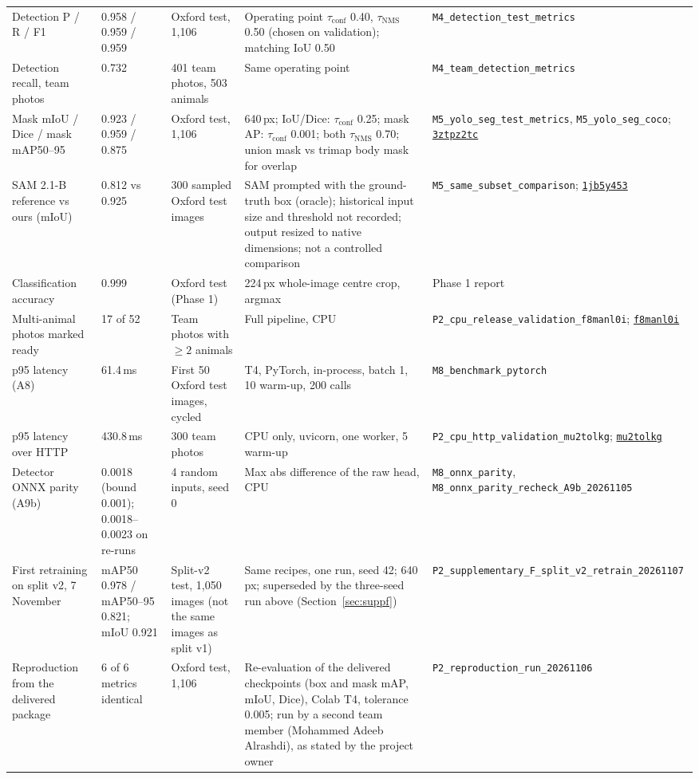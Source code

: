 \documentclass[11pt,a4paper]{article}
\newcommand{\tconf}{$\tau_{\text{conf}}$}
\newcommand{\tnms}{$\tau_{\text{NMS}}$}
\newcommand{\run}[1]{\href{https://wandb.ai/yasser-alhajlah-kaust/smart-pet-vision/runs/#1}{\texttt{#1}}}
\newcommand{\ev}[1]{\nolinkurl{#1}}
\begin{document}
{\begin{xltabular}{\linewidth}{@{}P{2.7cm} P{1.9cm} P{2.7cm} Y P{3.3cm}@{}}
Detection P / R / F1 & 0.958 / 0.959 / 0.959 & Oxford test, 1,106 & Operating point \tconf{} 0.40, \tnms{} 0.50 (chosen on validation); matching IoU 0.50 & \ev{M4_detection_test_metrics} \\
Detection recall, team photos & 0.732 & 401 team photos, 503 animals & Same operating point & \ev{M4_team_detection_metrics} \\
Mask mIoU / Dice / mask mAP50--95 & 0.923 / 0.959 / 0.875 & Oxford test, 1,106 & 640\,px; IoU/Dice: \tconf{} 0.25; mask AP: \tconf{} 0.001; both \tnms{} 0.70; union mask vs trimap body mask for overlap & \ev{M5_yolo_seg_test_metrics}, \ev{M5_yolo_seg_coco}; \run{3ztpz2tc} \\
SAM 2.1-B reference vs ours (mIoU) & 0.812 vs 0.925 & 300 sampled Oxford test images & SAM prompted with the ground-truth box (oracle); historical input size and threshold not recorded; output resized to native dimensions; not a controlled comparison & \ev{M5_same_subset_comparison}; \run{1jb5y453} \\
Classification accuracy & 0.999 & Oxford test (Phase 1) & 224\,px whole-image centre crop, argmax & Phase 1 report \\
Multi-animal photos marked ready & 17 of 52 & Team photos with $\geq2$ animals & Full pipeline, CPU & \ev{P2_cpu_release_validation_f8manl0i}; \run{f8manl0i} \\
p95 latency (A8) & 61.4\,ms & First 50 Oxford test images, cycled & T4, PyTorch, in-process, batch 1, 10 warm-up, 200 calls & \ev{M8_benchmark_pytorch} \\
p95 latency over HTTP & 430.8\,ms & 300 team photos & CPU only, uvicorn, one worker, 5 warm-up & \ev{P2_cpu_http_validation_mu2tolkg}; \run{mu2tolkg} \\
Detector ONNX parity (A9b) & 0.0018 (bound 0.001); 0.0018--0.0023 on re-runs & 4 random inputs, seed 0 & Max abs difference of the raw head, CPU & \ev{M8_onnx_parity}, \ev{M8_onnx_parity_recheck_A9b_20261105} \\
First retraining on split v2, 7 November & mAP50 0.978 / mAP50--95 0.821; mIoU 0.921 & Split-v2 test, 1,050 images (not the same images as split v1) & Same recipes, one run, seed 42; 640\,px; superseded by the three-seed run above (Section~\ref{sec:suppf}) & \ev{P2_supplementary_F_split_v2_retrain_20261107} \\
Reproduction from the delivered package & 6 of 6 metrics identical & Oxford test, 1,106 & Re-evaluation of the delivered checkpoints (box and mask mAP, mIoU, Dice), Colab T4, tolerance 0.005; run by a second team member (Mohammed Adeeb Alrashdi), as stated by the project owner & \ev{P2_reproduction_run_20261106} \\
\end{xltabular}}
\end{document}
